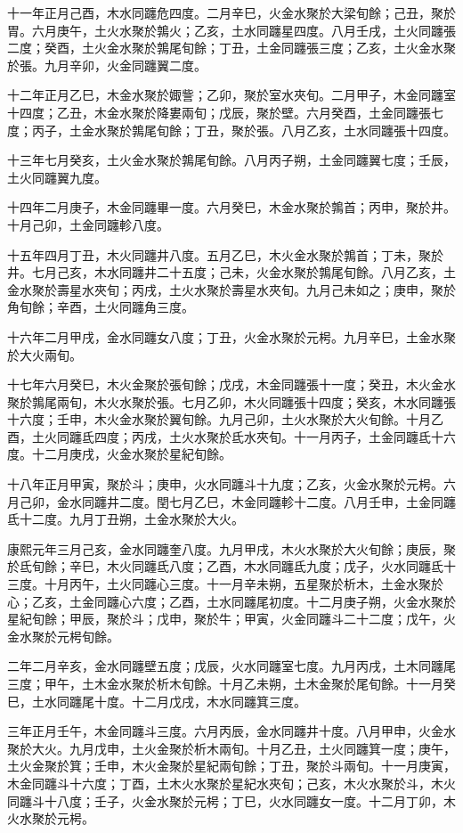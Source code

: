 \begin{pinyinscope}
十一年正月己酉，木水同躔危四度。二月辛巳，火金水聚於大梁旬餘；己丑，聚於胃。六月庚午，土火水聚於鶉火；乙亥，土水同躔星四度。八月壬戌，土火同躔張二度；癸酉，土火金水聚於鶉尾旬餘；丁丑，土金同躔張三度；乙亥，土火金水聚於張。九月辛卯，火金同躔翼二度。

十二年正月乙巳，木金水聚於娵訾；乙卯，聚於室水夾旬。二月甲子，木金同躔室十四度；乙丑，木金水聚於降婁兩旬；戊辰，聚於壁。六月癸酉，土金同躔張七度；丙子，土金水聚於鶉尾旬餘；丁丑，聚於張。八月乙亥，土水同躔張十四度。

十三年七月癸亥，土火金水聚於鶉尾旬餘。八月丙子朔，土金同躔翼七度；壬辰，土火同躔翼九度。

十四年二月庚子，木金同躔畢一度。六月癸巳，木金水聚於鶉首；丙申，聚於井。十月己卯，土金同躔軫八度。

十五年四月丁丑，木火同躔井八度。五月乙巳，木火金水聚於鶉首；丁未，聚於井。七月己亥，木水同躔井二十五度；己未，火金水聚於鶉尾旬餘。八月乙亥，土金水聚於壽星水夾旬；丙戌，土火水聚於壽星水夾旬。九月己未如之；庚申，聚於角旬餘；辛酉，土火同躔角三度。

十六年二月甲戌，金水同躔女八度；丁丑，火金水聚於元枵。九月辛巳，土金水聚於大火兩旬。

十七年六月癸巳，木火金聚於張旬餘；戊戌，木金同躔張十一度；癸丑，木火金水聚於鶉尾兩旬，木火水聚於張。七月乙卯，木火同躔張十四度；癸亥，木水同躔張十六度；壬申，木火金水聚於翼旬餘。九月己卯，土火水聚於大火旬餘。十月乙酉，土火同躔氐四度；丙戌，土火水聚於氐水夾旬。十一月丙子，土金同躔氐十六度。十二月庚戌，火金水聚於星紀旬餘。

十八年正月甲寅，聚於斗；庚申，火水同躔斗十九度；乙亥，火金水聚於元枵。六月己卯，金水同躔井二度。閏七月乙巳，木金同躔軫十二度。八月壬申，土金同躔氐十二度。九月丁丑朔，土金水聚於大火。

康熙元年三月己亥，金水同躔奎八度。九月甲戌，木火水聚於大火旬餘；庚辰，聚於氐旬餘；辛巳，木火同躔氐八度；乙酉，木水同躔氐九度；戊子，火水同躔氐十三度。十月丙午，土火同躔心三度。十一月辛未朔，五星聚於析木，土金水聚於心；乙亥，土金同躔心六度；乙酉，土水同躔尾初度。十二月庚子朔，火金水聚於星紀旬餘；甲辰，聚於斗；戊申，聚於牛；甲寅，火金同躔斗二十二度；戊午，火金水聚於元枵旬餘。

二年二月辛亥，金水同躔壁五度；戊辰，火水同躔室七度。九月丙戌，土木同躔尾三度；甲午，土木金水聚於析木旬餘。十月乙未朔，土木金聚於尾旬餘。十一月癸巳，土水同躔尾十度。十二月戊戌，木水同躔箕三度。

三年正月壬午，木金同躔斗三度。六月丙辰，金水同躔井十度。八月甲申，火金水聚於大火。九月戊申，土火金聚於析木兩旬。十月乙丑，土火同躔箕一度；庚午，土火金聚於箕；壬申，木火金聚於星紀兩旬餘；丁丑，聚於斗兩旬。十一月庚寅，木金同躔斗十六度；丁酉，土木火水聚於星紀水夾旬；己亥，木火水聚於斗，木火同躔斗十八度；壬子，火金水聚於元枵；丁巳，火水同躔女一度。十二月丁卯，木火水聚於元枵。


\end{pinyinscope}
